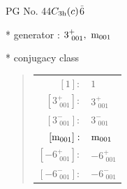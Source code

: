\documentclass[fleqn,8pt]{jsarticle}
\begin{document}
\setcounter{MaxMatrixCols}{32}

\renewcommand{\tablename}{Table~}
\renewcommand{\figurename}{Figure~}
\begin{center}
\LARGE
PG No. 44\quad$C_{\rm 3h}(c)$\quad$\bar{6}$\quad[ hexagonal ]
\end{center}

* generator : $3^{+}_{\,\,001},\,\,{\rm m}_{001}$

* conjugacy class
\begin{quote}
\begin{tabular}{rl}
$ [1]: $ & $ 1 $ \\
$ [3^{+}_{\,\,001}]: $ & $ 3^{+}_{\,\,001} $ \\
$ [3^{-}_{\,\,001}]: $ & $ 3^{-}_{\,\,001} $ \\
$ [{\rm m}_{001}]: $ & $ {\rm m}_{001} $ \\
$ [-6^{+}_{\,\,001}]: $ & $ -6^{+}_{\,\,001} $ \\
$ [-6^{-}_{\,\,001}]: $ & $ -6^{-}_{\,\,001} $
\end{tabular}
\end{quote}
\end{document}

